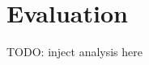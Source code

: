 \documentclass{article}
\begin{document}

\section{Evaluation}

TODO: inject analysis here





\end{document}
